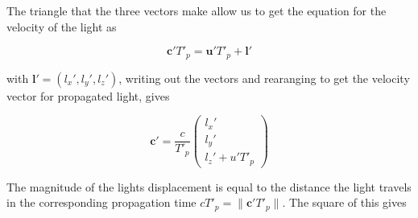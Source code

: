 \begin{derivation}

	The triangle that the three vectors make allow us to get the equation for the velocity of the light as

	\begin{equation}
		\mathbf{c'} T'_{p} = \mathbf{u'} T'_{p} + \mathbf{l'}
	\end{equation}

	with $\mathbf{l'}=(l_x',l_y',l_z')$, writing out the vectors and rearanging to get the velocity vector for propagated light, gives

	\begin{equation}
		\mathbf{c'} = \frac{c}{ T'_{p}}
		\begin{pmatrix}
			l_x' \\
			l_y' \\
			l_z' + u' T'_{p}
		\end{pmatrix}
	\end{equation}

	The magnitude of the lights displacement is equal to the distance the light travels in the corresponding propagation time $ c T'_{p} = \|\mathbf{c'} T'_{p}\|$. The square of this gives


\end{derivation}
